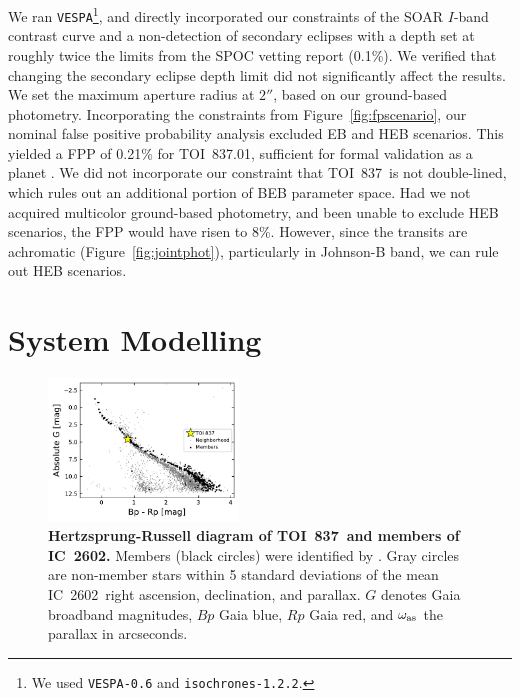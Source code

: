 \documentclass[12pt,twocolumn,tighten]{aastex63}
\newcommand{\tn}{TOI~837} %
\newcommand{\pn}{TOI~837.01} %
\newcommand{\cn}{IC~2602} %
\begin{document}
We ran \texttt{VESPA}\footnote{We used \texttt{VESPA-0.6} and
\texttt{isochrones-1.2.2}.}, and directly incorporated our constraints
of the SOAR $I$-band contrast curve and a non-detection of secondary
eclipses with a depth set at roughly twice the limits from the SPOC
vetting report (0.1\%).  We verified that changing the secondary
eclipse depth limit did not significantly affect the results.  We set
the maximum aperture radius at $2''$, based on our ground-based
photometry.  Incorporating the constraints from
Figure~\ref{fig:fpscenario}, our nominal false positive probability
analysis excluded EB and HEB scenarios.  This yielded a FPP of 0.21\%
for \pn, sufficient for formal validation as a planet
\citep{morton_efficient_2012}.  We did not incorporate our constraint
that \tn\ is not double-lined, which rules out an additional portion
of BEB parameter space.  Had we not acquired multicolor ground-based
photometry, and been unable to exclude HEB scenarios, the FPP would
have risen to 8\%.  However, since the transits are achromatic
(Figure~\ref{fig:jointphot}), particularly in Johnson-B band, we can
rule out HEB scenarios.


\section{System Modelling}
\label{sec:system}

\begin{figure}[!t]
	\begin{center}
		\leavevmode
		\includegraphics[width=0.45\textwidth]{f7.pdf}
	\end{center}
	\vspace{-0.7cm}
	\caption{ 
  {\bf Hertzsprung-Russell diagram of \tn\ and members of \cn.}
  Members (black circles) were identified by
  \citet{cantatgaudin_gaia_2018}.  Gray circles are non-member stars
  within 5 standard deviations of the mean \cn\ right ascension,
  declination, and parallax.  $G$ denotes Gaia broadband magnitudes,
  $Bp$ Gaia blue, $Rp$ Gaia red, and $\omega_{\rm as}$ the parallax in
  arcseconds. 
  \label{fig:hr}
	}
\end{figure}
\end{document}
